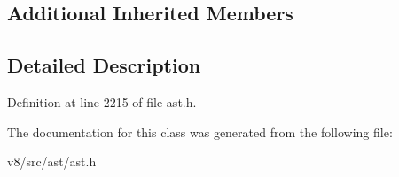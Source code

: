 \subsection*{Additional Inherited Members}


\subsection{Detailed Description}


Definition at line 2215 of file ast.\+h.



The documentation for this class was generated from the following file\+:\begin{DoxyCompactItemize}
\item 
v8/src/ast/ast.\+h\end{DoxyCompactItemize}
